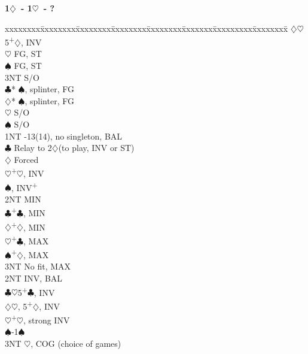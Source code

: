 \documentclass[10pt]{article}
\renewcommand{\c}{$\clubsuit$}
\renewcommand{\d}{$\diamondsuit$}
\newcommand{\h}{$\heartsuit$}
\newcommand{\s}{$\spadesuit$}
\newcommand{\p}{\textsuperscript{+}}
\newenvironment{bidtable}[1][]
{\textbf{#1}
  \begin{adjustwidth}{1em}{}
    \addvspace{2pt}
    \begin{tabbing}
      xxxxxxxx\=xxxxxxxx\=xxxxxxxx\=xxxxxxxx\=xxxxxxxx\=xxxxxxx\=xxxxxxxxx\=xxxxxxxx\=\kill}
{\end{tabbing}\end{adjustwidth}\bigskip}%
\begin{document}
\begin{bidtable}[1\d\ - 1\h\ - ?]
     \d  {}\h 5\p\d, INV                                  \\
     \h  \> FG, ST                                          \\
     \s  \> FG, ST                                          \\
     \> 3NT  \> S/O                                             \\
     \c* {}\s, splinter, FG                               \\
     \d* {}\s, splinter, FG                               \\
     \h  \> S/O                                             \\
     \s  \> S/O                                             \\
1NT  -13(14), no singleton, BAL                            \\%
     \c  \> Relay to 2\d (to play, INV or ST)               \\
     \>      \d \> Forced                                   \\
     \>      \>     \h  {}\p\h, INV                       \\
     \>      \>     \s  {}, INV\p                      \\
     \>      \>     \>      \> 2NT   \> MIN                     \\
     \>      \>     \>      \c   {}\p\c, MIN              \\
     \>      \>     \>      \d   {}\p\d, MIN              \\
     \>      \>     \>      \h   {}\p\c, MAX              \\
     \>      \>     \>      \s   {}\p\d, MAX              \\
     \>      \>     \>      \> 3NT   \> No fit, MAX             \\
     \>      \>     \> 2NT  \> INV, BAL                         \\
     \>      \>     \c  {}\h 5\p\c, INV                   \\
     \>      \>     \d  {}\h, 5\p\d, INV                  \\
     \>      \>     \h  {}\p\h, strong INV                \\
     \>      \>     \s  {}-1\s                            \\
     \>      \>     \> 3NT  \h, COG (choice of games)       \\

\end{bidtable}
\end{document}
